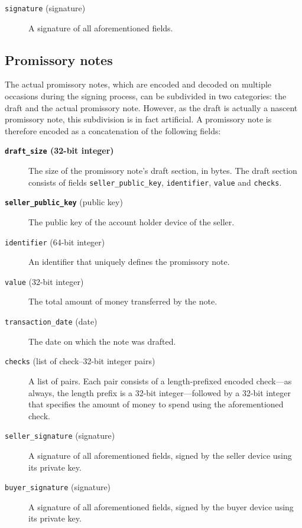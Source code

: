 \documentclass[12pt,a4paper]{article}
\begin{document}
\begin{multicols}{2}
\begin{description}
		\item[\texttt{signature} (signature)] A signature of all aforementioned fields.
	\end{description}

	\subsection{Promissory notes}
 
 	The actual promissory notes, which are encoded and decoded on multiple occasions during the signing process, can be subdivided in two categories: the draft and the actual promissory note. However, as the draft is actually a nascent promissory note, this subdivision is in fact artificial. A promissory note is therefore encoded as a concatenation of the following fields:
 
	\begin{description}
		\item[\textbf{\texttt{draft\_size} (32-bit integer)}] The size of the promissory note's draft section, in bytes. The draft section consists of fields \texttt{seller\_public\_key}, \texttt{identifier}, \texttt{value} and \texttt{checks}.
		
		\item[\textbf{\texttt{seller\_public\_key}} (public key)]  The public key of the account holder device of the seller.
		
		\item[\texttt{identifier} (64-bit integer)] An identifier that uniquely defines the promissory note.
		
		\item[\texttt{value} (32-bit integer)] The total amount of money transferred by the note.
		
		\item[\texttt{transaction\_date} (date)] The date on which the note was drafted.
		
		\item[\texttt{checks} (list of check--32-bit integer pairs)] A list of pairs. Each pair consists of a length-prefixed encoded check---as always, the length prefix is a 32-bit integer---followed by a 32-bit integer that specifies the amount of money to spend using the aforementioned check.
		
		\item[\texttt{seller\_signature} (signature)] A signature of all aforementioned fields, signed by the seller device using its private key.
		
		\item[\texttt{buyer\_signature} (signature)] A signature of all aforementioned fields, signed by the buyer device using its private key.
	\end{description}


\end{multicols}
\end{document}
